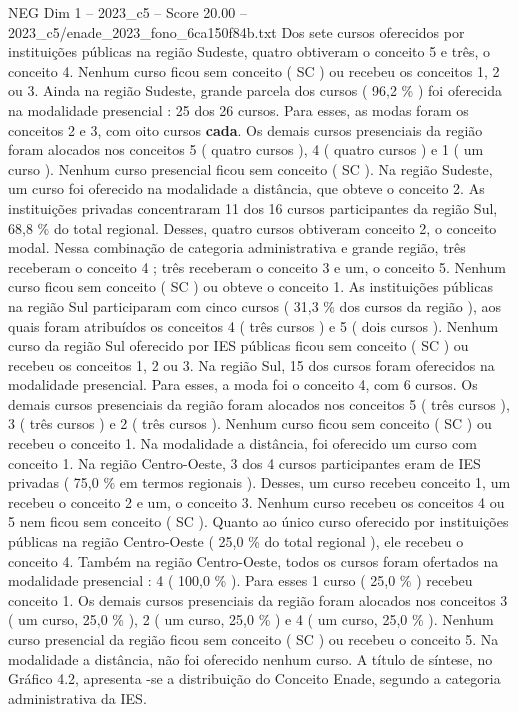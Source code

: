 \begin{textsample}{NEG Dim 1 – 2023\_c5 – Score 20.00 – 2023\_c5/enade\_2023\_fono\_6ca150f84b.txt}
Dos sete cursos oferecidos por instituições públicas na região Sudeste, quatro obtiveram o conceito 5 e três, o conceito 4.
Nenhum curso ficou sem conceito ( SC ) ou recebeu os conceitos 1, 2 ou 3.
Ainda na região Sudeste, grande parcela dos cursos ( 96,2 \% ) foi oferecida na modalidade presencial : 25 dos 26 cursos.
Para esses, as modas foram os conceitos 2 e 3, com oito cursos \textbf{cada}.
Os demais cursos presenciais da região foram alocados nos conceitos 5 ( quatro cursos ), 4 ( quatro cursos ) e 1 ( um curso ).
Nenhum curso presencial ficou sem conceito ( SC ).
Na região Sudeste, um curso foi oferecido na modalidade a distância, que obteve o conceito 2.
As instituições privadas concentraram 11 dos 16 cursos participantes da região Sul, 68,8 \% do total regional.
Desses, quatro cursos obtiveram conceito 2, o conceito modal.
Nessa combinação de categoria administrativa e grande região, três receberam o conceito 4 ; três receberam o conceito 3 e um, o conceito 5.
Nenhum curso ficou sem conceito ( SC ) ou obteve o conceito 1.
As instituições públicas na região Sul participaram com cinco cursos ( 31,3 \% dos cursos da região ), aos quais foram atribuídos os conceitos 4 ( três cursos ) e 5 ( dois cursos ).
Nenhum curso da região Sul oferecido por IES públicas ficou sem conceito ( SC ) ou recebeu os conceitos 1, 2 ou 3.
Na região Sul, 15 dos cursos foram oferecidos na modalidade presencial.
Para esses, a moda foi o conceito 4, com 6 cursos.
Os demais cursos presenciais da região foram alocados nos conceitos 5 ( três cursos ), 3 ( três cursos ) e 2 ( três cursos ).
Nenhum curso ficou sem conceito ( SC ) ou recebeu o conceito 1.
Na modalidade a distância, foi oferecido um curso com conceito 1.
Na região Centro-Oeste, 3 dos 4 cursos participantes eram de IES privadas ( 75,0 \% em termos regionais ).
Desses, um curso recebeu conceito 1, um recebeu o conceito 2 e um, o conceito 3.
Nenhum curso recebeu os conceitos 4 ou 5 nem ficou sem conceito ( SC ).
Quanto ao único curso oferecido por instituições públicas na região Centro-Oeste ( 25,0 \% do total regional ), ele recebeu o conceito 4.
Também na região Centro-Oeste, todos os cursos foram ofertados na modalidade presencial : 4 ( 100,0 \% ).
Para esses 1 curso ( 25,0 \% ) recebeu conceito 1.
Os demais cursos presenciais da região foram alocados nos conceitos 3 ( um curso, 25,0 \% ), 2 ( um curso, 25,0 \% ) e 4 ( um curso, 25,0 \% ).
Nenhum curso presencial da região ficou sem conceito ( SC ) ou recebeu o conceito 5.
Na modalidade a distância, não foi oferecido nenhum curso.
A título de síntese, no Gráfico 4.2, apresenta -se a distribuição do Conceito Enade, segundo a categoria administrativa da IES.

\end{textsample}
